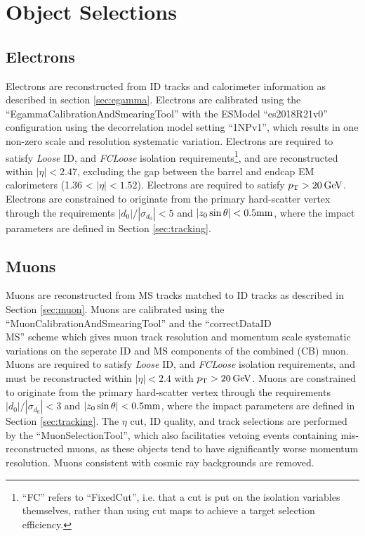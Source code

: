 \section{Object Selections\label{sec:insitu:largerobj}}
\subsection{Electrons}
Electrons are reconstructed from ID tracks and calorimeter information as described in section \ref{sec:egamma}. Electrons are calibrated using the ``EgammaCalibrationAndSmearingTool'' with the ESModel ``es2018\tu R21\tu v0'' configuration using the decorrelation model setting ``1NP\tu v1'', which results in one non-zero scale and resolution systematic variation. Electrons are required to satisfy \textit{Loose} ID, and \textit{FCLoose} isolation requirements\footnote{``FC'' refers to ``FixedCut'', i.e. that a cut is put on the isolation variables themselves, rather than using cut maps to achieve a target selection efficiency.}, and are reconstructed within $|\eta|<2.47$, excluding the gap between the barrel and endcap EM calorimeters (1.36 < $|\eta|<1.52$). Electrons are required to satisfy $p_{\text{T}}>20\hspace{2pt}\text{Ge\kern -0.1em V}$. Electrons are constrained to originate from the primary hard-scatter vertex through the requirements $|d_0|/|{\sigma_{d_0}}|<5$ and $|z_0\sin\theta|<0.5\text{mm}$, where the impact parameters are defined in Section \ref{sec:tracking}.
\subsection{Muons}
Muons are reconstructed from MS tracks matched to ID tracks as described in Section \ref{sec:muon}. Muons are calibrated using the ``MuonCalibrationAndSmearingTool'' and the ``correctData\tu ID\\MS'' scheme which gives muon track resolution and momentum scale systematic variations on the seperate ID and MS components of the combined (CB) muon.  Muons are required to satisfy \textit{Loose} ID, and \textit{FCLoose} isolation requirements, and must be reconstructed within $|\eta|<2.4$ with $p_{\text{T}}>20\hspace{2pt}\text{Ge\kern -0.1em V}$. Muons are constrained to originate from the primary hard-scatter vertex through the requirements $|d_0|/|{\sigma_{d_0}}|<3$ and $|z_0\sin\theta|<0.5\text{mm}$, where the impact parameters are defined in Section \ref{sec:tracking}. The $\eta$ cut, ID quality, and track selections are performed by the ``MuonSelectionTool'', which also facilitaties vetoing events containing mis-reconstructed muons, as these objects tend to have significantly worse momentum resolution. Muons consistent with cosmic ray backgrounds are removed.
